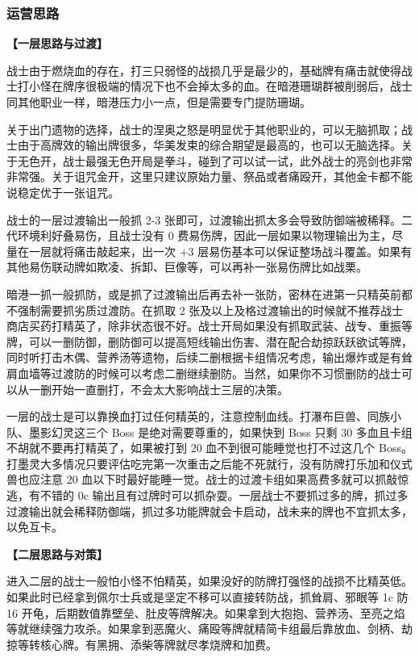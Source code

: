 ﻿\documentclass[12pt, a4paper]{article}
\begin{document}
\subsubsection{运营思路}

\textbf{【一层思路与过渡】}

战士由于燃烧血的存在，打三只弱怪的战损几乎是最少的，基础牌有痛击就使得战士打小怪在牌序很极端的情况下也不会掉太多的血。在暗港珊瑚群被削弱后，战士同其他职业一样，暗港压力小一点，但是需要专门提防珊瑚。

关于出门遗物的选择，战士的涅奥之怒是明显优于其他职业的，可以无脑抓取；战士由于高牌效的输出牌很多，华美发束的综合期望是最高的，也可以无脑选择。关于无色开，战士最强无色开局是拳斗，碰到了可以试一试，此外战士的亮剑也非常非常强。关于诅咒金开，这里只建议原始力量、祭品或者痛殴开，其他金卡都不能说稳定优于一张诅咒。

战士的一层过渡输出一般抓 2-3 张即可，过渡输出抓太多会导致防御端被稀释。二代环境利好叠易伤，且战士没有 0 费易伤牌，因此一层如果以物理输出为主，尽量在一层就将痛击敲起来，出一次 +3 层易伤基本可以保证整场战斗覆盖。如果有其他易伤联动牌如欺凌、拆卸、巨像等，可以再补一张易伤牌比如战栗。

暗港一抓一般抓防，或是抓了过渡输出后再去补一张防，密林在进第一只精英前都不强制需要抓劣质过渡防。在抓取 2 张及以上及格过渡输出的时候就不推荐战士商店买药打精英了，除非状态很不好。战士开局如果没有抓取武装、战专、重振等牌，可以一删防御，删防御可以提高短线输出伤害、潜在配合劫掠跃跃欲试等牌，同时听打击木偶、营养汤等遗物，后续二删根据卡组情况考虑，输出爆炸或是有耸肩血墙等过渡防的时候可以考虑二删继续删防。当然，如果你不习惯删防的战士可以从一删开始一直删打，不会太大影响战士三层的决策。

一层的战士是可以靠换血打过任何精英的，注意控制血线。打瀑布巨兽、同族小队、墨影幻灵这三个 Boss 是绝对需要尊重的，如果快到 Boss 只剩 30 多血且卡组不胡就不要再打精英了，如果被打到 20 血不到很可能睡觉也打不过这几个 Boss。打墨灵大多情况只要评估吃完第一次重击之后能不死就行，没有防牌打乐加和仪式兽也应注意 20 血以下时最好能睡一觉。战士的过渡卡组如果高费多就可以抓敲惊逃，有不错的 0c 输出且有过牌时可以抓杂耍。一层战士不要抓过多的牌，抓过多过渡输出就会稀释防御端，抓过多功能牌就会卡启动，战未来的牌也不宜抓太多，以免互卡。

\textbf{【二层思路与对策】}

进入二层的战士一般怕小怪不怕精英，如果没好的防牌打强怪的战损不比精英低。如果此时已经拿到佩尔士兵或是坚定不移可以直接转防战，抓耸肩、邪眼等 1c 防 16 开龟，后期数值靠壁垒、肚皮等牌解决。如果拿到大抱抱、营养汤、至亮之焰等就继续强力攻杀。如果拿到恶魔火、痛殴等牌就精简卡组最后靠放血、剑柄、劫掠等转核心牌。有黑拥、添柴等牌就尽孝烧牌和加费。
\end{document}
